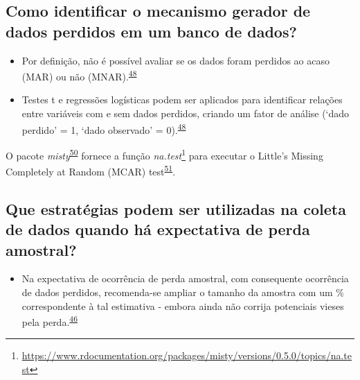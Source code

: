 \documentclass[
  a4paper,
]{book}
\providecommand{\tightlist}{%
  \setlength{\itemsep}{0pt}\setlength{\parskip}{0pt}}
\renewcommand{\href}[2]{#2\footnote{\url{#1}}}
\newenvironment{infobox}[1]
  {
  \begin{itemize}
  \renewcommand{\labelitemi}{
    \raisebox{-.7\height}[0pt][0pt]{
      {\setkeys{Gin}{width=3em,keepaspectratio}
        \texttt{[image: \#1]}}
    }
  }
  \setlength{\fboxsep}{1em}
  \begin{blackbox}
  \item
  }
  {
  \end{blackbox}
  \end{itemize}
  }
\begin{document}
\hypertarget{como-identificar-o-mecanismo-gerador-de-dados-perdidos-em-um-banco-de-dados}{%
\subsection{Como identificar o mecanismo gerador de dados perdidos em um banco de dados?}\label{como-identificar-o-mecanismo-gerador-de-dados-perdidos-em-um-banco-de-dados}}

\begin{itemize}
\item
  Por definição, não é possível avaliar se os dados foram perdidos ao acaso (MAR) ou não (MNAR).\textsuperscript{\protect\hyperlink{ref-Heymans2022}{48}}
\item
  Testes t e regressões logísticas podem ser aplicados para identificar relações entre variáveis com e sem dados perdidos, criando um fator de análise (`dado perdido' = 1, `dado observado' = 0).\textsuperscript{\protect\hyperlink{ref-Heymans2022}{48}}
\end{itemize}

\begin{infobox}{images/Rlogo}
O pacote \emph{misty}\textsuperscript{\protect\hyperlink{ref-misty}{50}} fornece a função \href{https://www.rdocumentation.org/packages/misty/versions/0.5.0/topics/na.test}{\emph{na.test}} para executar o Little's Missing Completely at Random (MCAR) test\textsuperscript{\protect\hyperlink{ref-little1988}{51}}.

\end{infobox}

\hypertarget{que-estratuxe9gias-podem-ser-utilizadas-na-coleta-de-dados-quando-huxe1-expectativa-de-perda-amostral}{%
\subsection{Que estratégias podem ser utilizadas na coleta de dados quando há expectativa de perda amostral?}\label{que-estratuxe9gias-podem-ser-utilizadas-na-coleta-de-dados-quando-huxe1-expectativa-de-perda-amostral}}

\begin{itemize}
\tightlist
\item
  Na expectativa de ocorrência de perda amostral, com consequente ocorrência de dados perdidos, recomenda-se ampliar o tamanho da amostra com um \% correspondente à tal estimativa - embora ainda não corrija potenciais vieses pela perda.\textsuperscript{\protect\hyperlink{ref-Altman2007}{46}}
\end{itemize}
\end{document}
